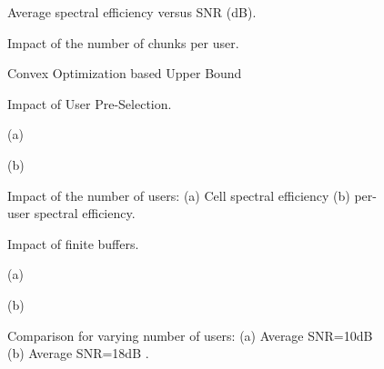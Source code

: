 \documentclass[11pt] {article}
\begin{document}
\begin{figure}[htb!]
\begin{center}
\centerline{}
\caption{Average spectral efficiency versus SNR (dB).}
\label{fig_plot2}
\end{center}
\end{figure}



\begin{figure}[htb!]
\begin{center}
\centerline{}
\caption{Impact of the number of chunks per user.}
\label{fig_plot4}
\end{center}
\end{figure}

\begin{figure}[htb!]
\begin{center}
\centerline{}
\caption{Convex Optimization based Upper Bound}
\label{fig_newUB}
\end{center}
\end{figure}


\begin{figure}[htb!]
\begin{center}
\centerline{}
\caption{Impact of User Pre-Selection.}
\label{fig_plot3}
\end{center}
\end{figure}


\begin{figure}[htb!]
\begin{center}
\centerline{}
\centerline{\small (a)}
\centerline{}
\centerline{\small (b)}
\caption{Impact of the number of users: (a) Cell spectral efficiency (b) per-user spectral efficiency.}
\label{fig_plotincu}
\end{center}
\end{figure}



\begin{figure}[htb!]
\begin{center}
\centerline{}
\caption{Impact of finite buffers.}
\label{fig_plotfb}
\end{center}
\end{figure}

\begin{figure}[htb!]
\begin{center}
\centerline{}
\centerline{\small (a)}
\centerline{}
\centerline{\small (b)}
\caption{Comparison for varying number of users: (a) Average SNR=10dB (b) Average SNR=18dB .}
\label{fig_plotcompnew}
\end{center}
\end{figure}
\end{document}
